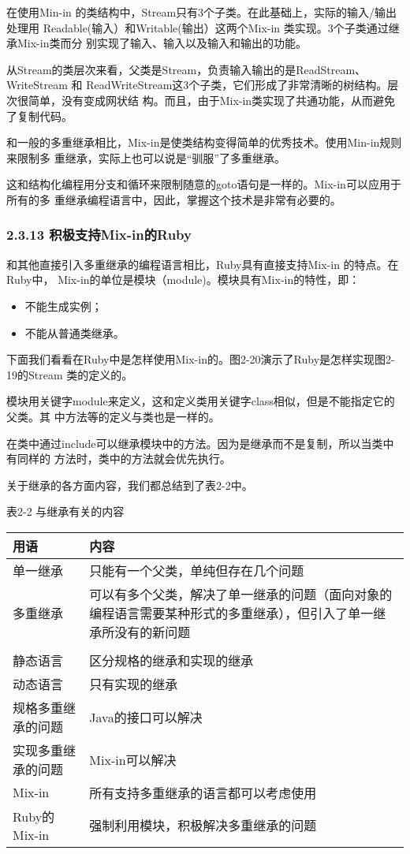 \documentclass[11pt]{ctexart}
\begin{document}
在使用Min-in 的类结构中，Stream只有3个子类。在此基础上，实际的输入/输出处理用
Readable(输入）和Writable(输出）这两个Mix-in 类实现。3个子类通过继承Mix-in类而分
别实现了输入、输入以及输入和输出的功能。

从Stream的类层次来看，父类是Stream，负责输入输出的是ReadStream、WriteStream 和
ReadWriteStream这3个子类，它们形成了非常清晰的树结构。层次很简单，没有变成网状结
构。而且，由于Mix-in类实现了共通功能，从而避免了复制代码。

和一般的多重继承相比，Mix-in是使类结构变得简单的优秀技术。使用Min-in规则来限制多
重继承，实际上也可以说是“驯服”了多重继承。

这和结构化编程用分支和循环来限制随意的goto语句是一样的。Mix-in可以应用于所有的多
重继承编程语言中，因此，掌握这个技术是非常有必要的。
\subsubsection{2.3.13 积极支持Mix-in的Ruby}
\label{sec:org68855a2}

和其他直接引入多重继承的编程语言相比，Ruby具有直接支持Mix-in 的特点。在Ruby中，
Mix-in的单位是模块（module)。模块具有Mix-in的特性，即：

\begin{itemize}
\item 不能生成实例；
\item 不能从普通类继承。
\end{itemize}

下面我们看看在Ruby中是怎样使用Mix-in的。图2-20演示了Ruby是怎样实现图2-19的Stream
类的定义的。

模块用关键字module来定义，这和定义类用关键字class相似，但是不能指定它的父类。其
中方法等的定义与类也是一样的。

在类中通过include可以继承模块中的方法。因为是继承而不是复制，所以当类中有同样的
方法时，类中的方法就会优先执行。

关于继承的各方面内容，我们都总结到了表2-2中。

表2-2 与继承有关的内容

\begin{center}
\begin{tabular}{ll}
用语 & 内容\\
\hline
单一继承 & 只能有一个父类，单纯但存在几个问题\\
\hline
多重继承 & 可以有多个父类，解决了单一继承的问题（面向对象的编程语言需要某种形式的多重继承），但引入了单一继承所没有的新问题\\
 & \\
\hline
静态语言 & 区分规格的继承和实现的继承\\
\hline
动态语言 & 只有实现的继承\\
\hline
规格多重继承的问题 & Java的接口可以解决\\
\hline
实现多重继承的问题 & Mix-in可以解决\\
\hline
Mix-in & 所有支持多重继承的语言都可以考虑使用\\
\hline
Ruby的Mix-in & 强制利用模块，积极解决多重继承的问题\\
\hline
\end{tabular}
\end{center}
\end{document}

